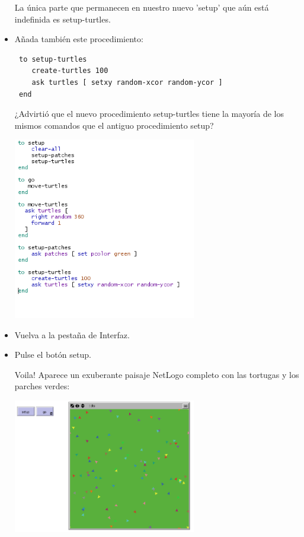 \documentclass[12pt,letterpaper]{article}
\begin{document}
\begin{itemize}
La única parte que permanecen en nuestro nuevo 'setup' que aún está indefinida es setup-turtles.

\item Añada también este procedimiento:
\begin{lstlisting}
 to setup-turtles
    create-turtles 100
    ask turtles [ setxy random-xcor random-ycor ]
 end
\end{lstlisting}

¿Advirtió que el nuevo procedimiento setup-turtles tiene la mayoría de los mismos comandos que el antiguo procedimiento setup?

\begin{center}
	\includegraphics[width=8cm]{./imagenes/image5.png}
\end{center}


\item Vuelva a la pestaña de Interfaz.
\item Pulse el botón setup.

Voila! Aparece un exuberante paisaje NetLogo completo con las tortugas y los parches verdes:

\begin{center}
	\includegraphics[width=8cm]{./imagenes/image6.png}
\end{center}



\end{itemize}
\end{document}
